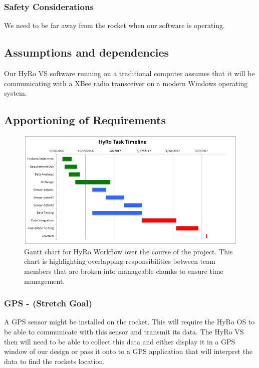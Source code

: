 \documentclass[10pt,draftclsnofoot,onecolumn,compsoc]{IEEEtran}
\begin{document}
\subsubsection{\bf Safety Considerations} We need to be far away from the rocket when our software is operating.

\subsection{Assumptions and dependencies}
Our HyRo VS software running on a traditional computer assumes that it will be communicating with a XBee radio transceiver on a modern Windows operating system.

\subsection{Apportioning of Requirements}
\begin{figure}
  \caption{Gantt chart for HyRo Workflow over the course of the project. This chart is highlighting overlapping responsibilities between team members that are broken into manageable chunks to ensure time management. }
  \centering
	\includegraphics[scale=.75]{GanntChart}
\end{figure}
\FloatBarrier
\subsubsection{\bf GPS - (Stretch Goal)} A GPS sensor might be installed on the rocket. This will require the HyRo OS to be able to communicate with this sensor and transmit its data. The HyRo VS then will need to be able to collect this data and either display it in a GPS window of our design or pass it onto to a GPS application that will interpret the data to find the rockets location.
\end{document}
